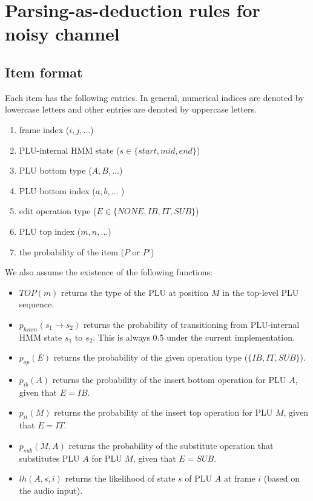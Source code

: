 \documentclass[12pt,letterpaper]{article}
\begin{document}
\section{Parsing-as-deduction rules for noisy channel}
\subsection{Item format}
Each item has the following entries. In general, numerical indices are denoted by lowercase letters and other entries are denoted by uppercase letters. 
\begin{enumerate}
\item frame index ($i, j, ...$)
\item PLU-internal HMM state ($s \in \{start, mid, end\}$)
\item PLU bottom type ($A, B, ...$)
\item PLU bottom index ($a, b, ...$ )
\item edit operation type ($E \in \{NONE, IB, IT, SUB\}$)
\item PLU top index ($m, n, ...$)
\item the probability of the item ($P$ or $P'$)
\end{enumerate}

\noindent We also assume the existence of the following functions:
\begin{itemize}
	\item $TOP(m)$ returns the type of the PLU at position $M$ in the top-level PLU sequence.
	\item $p_{hmm}(s_1 \rightarrow s_2)$ returns the probability of transitioning from PLU-internal HMM state $s_1$ to $s_2$. This is always 0.5 under the current implementation.
	\item $p_{op}(E)$ returns the probability of the given operation type ($\{IB, IT, SUB\}$).
	\item $p_{ib}(A)$ returns the probability of the insert bottom operation for PLU $A$, given that $E=IB$.
	\item $p_{it}(M)$ returns the probability of the insert top operation for PLU $M$, given that $E=IT$.
	\item $p_{sub}(M,A)$ returns the probability of the substitute operation that substitutes PLU $A$ for PLU $M$, given that $E=SUB$.
	\item $lh(A,s,i)$ returns the likelihood of state $s$ of PLU $A$ at frame $i$ (based on the audio input).
\end{itemize}
\end{document}
